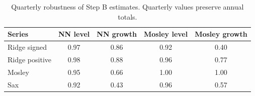 \begin{table}[!htb]
\centering
\caption{Quarterly robustness of Step B estimates. Quarterly values preserve annual totals.}
\label{tab:quarterly_stepb_robustness}
\begin{tabular}{l c c c c}
\toprule
Series & NN level & NN growth & Mosley level & Mosley growth \\
\midrule
Ridge signed & 0.97 & 0.86 & 0.92 & 0.40 \\
Ridge positive & 0.98 & 0.88 & 0.96 & 0.77 \\
Mosley & 0.95 & 0.66 & 1.00 & 1.00 \\
Sax & 0.92 & 0.43 & 0.96 & 0.57 \\
\bottomrule
\end{tabular}
\end{table}
